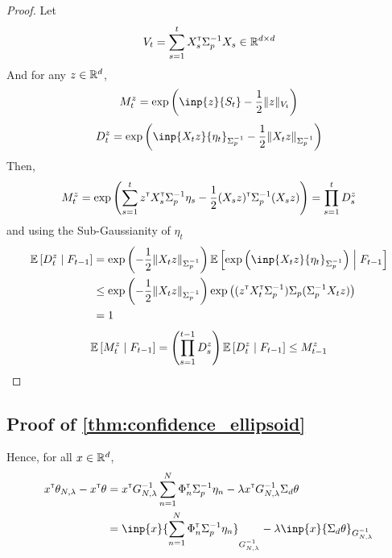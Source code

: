 \documentclass{article}
\begin{document}
\begin{proof}

Let 
\begin{equation*}
    V_t = \sum_{s=1}^t X_s^{\mathsf{\scriptscriptstyle T}} \Sigma_p^{-1} X_s \in \mathbb{R}^{d\times d}
\end{equation*}
And for any $z\in\mathbb{R}^d$,
\begin{equation*}
    M_t^z = \exp{\left(\inp{z}{S_t} - \frac{1}{2}\|z\|_{V_t}\right)}
\end{equation*}
\begin{equation*}
    D_t^z = \exp{\left(\inp{X_t z}{\eta_t}_{\Sigma_p^{-1}} - \frac{1}{2}\|X_t z\|_{\Sigma_p^{-1}}\right)}
\end{equation*}
Then,
\begin{align*}
    M_t^z = \exp{\left(\sum_{s=1}^t z^{\mathsf{\scriptscriptstyle T}}X_s^{\mathsf{\scriptscriptstyle T}}\Sigma_p^{-1} \eta_s - \frac{1}{2} (X_s z)^{\mathsf{\scriptscriptstyle T}}\Sigma_p^{-1}(X_s z) \right)} = \prod_{s=1}^{t} D_s^z
\end{align*}
and using the Sub-Gaussianity of $\eta_t$
\begin{align*}
    \expectedvalue\left[D_t^z \condbar F_{t-1}\right] &= \exp{\left(- \frac{1}{2}\|X_t z\|_{\Sigma_p^{-1}}\right)} \expectedvalue\left[\exp{\left(\inp{X_t z}{\eta_t}_{\Sigma_p^{-1}}\right)} \condbar F_{t-1}\right]  \\
    &\leq \exp{\left(- \frac{1}{2}\|X_t z\|_{\Sigma_p^{-1}}\right)}\exp{\left((z^\transp X_t^\transp \Sigma_p^{-1})\Sigma_p(\Sigma_p^{-1} X_t z)\right)}\\
    &= 1
\end{align*}
\begin{align*}
    \operatorname*{\mathbb{E}}\left[M_t^z \;\middle|\; F_{t-1}\right] = \left(\prod_{s=1}^{t-1} D_s^z\right) \operatorname*{\mathbb{E}}\left[D_t^z \;\middle|\; F_{t-1}\right] \leq M_{t-1}^z
\end{align*}

\end{proof}

\subsection{Proof of \autoref{thm:confidence_ellipsoid}}

Hence, for all $x\in\mathbb{R}^d$,
\begin{align*}
    x^\transp\theta_{N,\lambda}  -x^\transp\theta &= x^\transp G_{N, \lambda}^{-1}\sum_{n=1}^N \Phi_n^\transp \Sigma_p^{-1}\eta_n
    - \lambda x^\transp G_{N, \lambda}^{-1}\Sigma_d\theta\\
    &= \inp{x}{\sum_{n=1}^N \Phi_n^\transp \Sigma_p^{-1}\eta_n}_{G_{N, \lambda}^{-1}} - \lambda\inp{x}{\Sigma_d\theta}_{G_{N, \lambda}^{-1}}
\end{align*}
\end{document}
